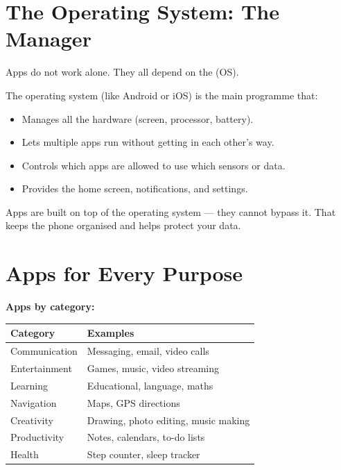 \sectionrule

\section*{The Operating System: The Manager}

Apps do not work alone. They all depend on the  (OS).

The operating system (like Android or iOS) is the main programme that:
\begin{itemize}
  \item Manages all the hardware (screen, processor, battery).
  \item Lets multiple apps run without getting in each other's way.
  \item Controls which apps are allowed to use which sensors or data.
  \item Provides the home screen, notifications, and settings.
\end{itemize}

Apps are built on top of the operating system — they cannot bypass it.
That keeps the phone organised and helps protect your data.

\sectionrule

\section*{Apps for Every Purpose}

\begin{quickmap}
  \textbf{Apps by category:}
  \begin{center}
  \begin{tabular}{ll}
    \textbf{Category} & \textbf{Examples} \\
    \hline
    Communication   & Messaging, email, video calls \\
    Entertainment   & Games, music, video streaming \\
    Learning        & Educational, language, maths \\
    Navigation      & Maps, GPS directions \\
    Creativity      & Drawing, photo editing, music making \\
    Productivity    & Notes, calendars, to-do lists \\
    Health          & Step counter, sleep tracker \\
  \end{tabular}
  \end{center}
\end{quickmap}

